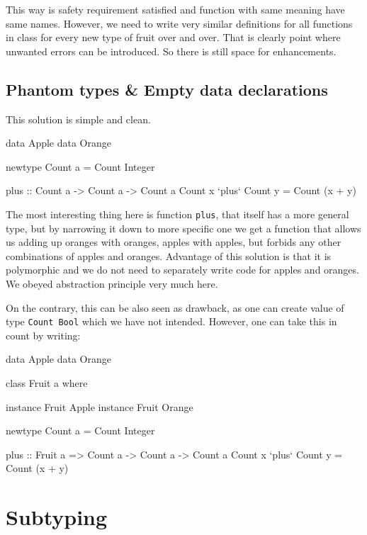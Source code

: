 \documentclass[11pt,oneside,draft]{fithesis2}
\theoremstyle{definition}
\begin{document}
This way is safety requirement satisfied and function
with same meaning have same names. However, we need to write
very similar definitions for all functions in class
for every new type of fruit over and over. That is clearly
point where unwanted errors can be introduced. So there is still
space for enhancements.


\subsection{Phantom types \& Empty data declarations}

This solution is simple and clean.
\begin{code}
data Apple
data Orange

newtype Count a = Count Integer

plus :: Count a -> Count a -> Count a
Count x `plus` Count y = Count (x + y)
\end{code}
The most interesting thing here is function \texttt{plus}, that itself has a more general type, but
by narrowing it down to more specific one we get a function that allows us
adding up oranges with oranges, apples with apples, but forbids any other combinations
of apples and oranges. Advantage of this solution is that it is polymorphic
and we do not need to separately write code for apples and oranges.
We obeyed abstraction principle very much here.

On the contrary, this can be also seen as drawback, as one can create value
of type \texttt{Count Bool} which we have not intended. However,
one can take this in count by writing:
\begin{code}
data Apple
data Orange

class Fruit a where

instance Fruit Apple
instance Fruit Orange

newtype Count a = Count Integer

plus :: Fruit a => Count a -> Count a -> Count a
Count x `plus` Count y = Count (x + y)
\end{code}

%

\section{Subtyping}
\end{document}
